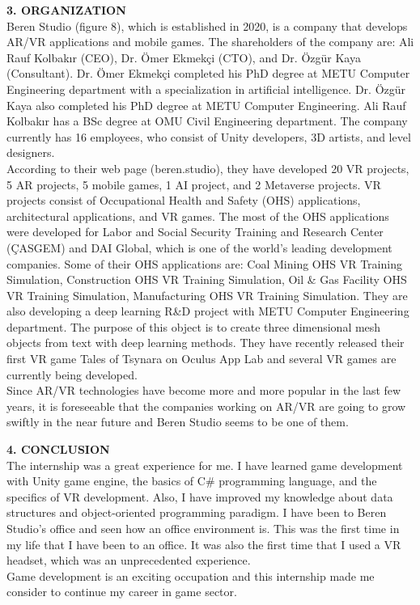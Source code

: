 \documentclass[a4paper]{article}
\begin{document}
\newpage

\noindent
\textbf{3. ORGANIZATION}\vspace{0.5cm}\\
\indent Beren Studio (figure 8), which is established in 2020, is a company that develops AR/VR applications and mobile games. The shareholders of the company are: Ali Rauf Kolbakır (CEO), Dr. Ömer Ekmekçi (CTO), and Dr. Özgür Kaya (Consultant). Dr. Ömer Ekmekçi completed his PhD degree at METU Computer Engineering department with a specialization in artificial intelligence. Dr. Özgür Kaya also completed his PhD degree at METU Computer Engineering. Ali Rauf Kolbakır has a BSc degree at OMU Civil Engineering department. The company currently has 16 employees, who consist of Unity developers, 3D artists, and level designers.\\
\indent According to their web page (beren.studio), they have developed 20 VR projects, 5 AR projects, 5 mobile games, 1 AI project, and 2 Metaverse projects. VR projects consist of Occupational Health and Safety (OHS) applications, architectural applications, and VR games. The most of the OHS applications were developed for Labor and Social Security Training and Research Center (ÇASGEM) and DAI Global, which is one of the world's leading development companies. Some of their OHS applications are: Coal Mining OHS VR Training Simulation, Construction OHS VR Training Simulation, Oil \& Gas Facility OHS VR Training Simulation, Manufacturing OHS VR Training Simulation. They are also developing a deep learning R\&D project with METU Computer Engineering department. The purpose of this object is to create three dimensional mesh objects from text with deep learning methods. They have recently released their first VR game Tales of Tsynara on Oculus App Lab and several VR games are currently being developed.\\
\indent Since AR/VR technologies have become more and more popular in the last few years, it is foreseeable that the companies working on AR/VR are going to grow swiftly in the near future and Beren Studio seems to be one of them.\vspace{1cm}

\noindent
\textbf{4. CONCLUSION}\vspace{0.5cm}\\
\indent The internship was a great experience for me. I have learned game development with Unity game engine, the basics of C\# programming language, and the specifics of VR development. Also, I have improved my knowledge about data structures and object-oriented programming paradigm. I have been to Beren Studio's office and seen how an office environment is. This was the first time in my life that I have been to an office. It was also the first time that I used a VR headset, which was an unprecedented experience.\\
Game development is an exciting occupation and this internship made me consider to continue my career in game sector.\vspace{1cm}
\end{document}
